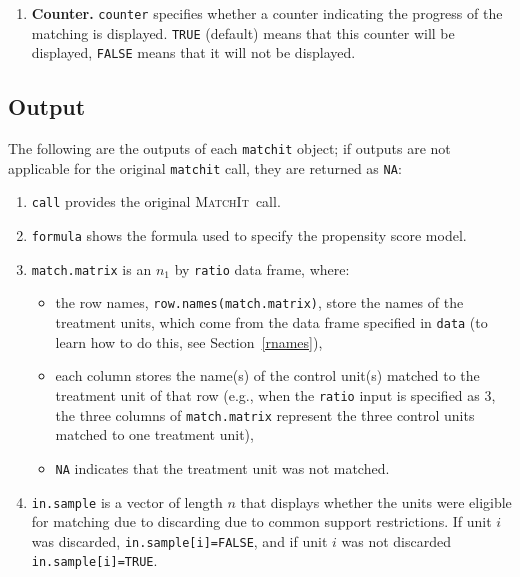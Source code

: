 \documentclass[oneside,letterpaper,titlepage]{article}
\newcommand{\MatchIt}{\textsc{MatchIt}}
\begin{document}
\begin{enumerate}
\item \textbf{Counter.} \texttt{counter} specifies whether a counter
  indicating the progress of the matching is displayed.  \texttt{TRUE}
  (default) means that this counter will be displayed, \texttt{FALSE}
  means that it will not be displayed.

\end{enumerate}
  
\subsection{Output}

The following are the outputs of each \texttt{matchit} object; if
outputs are not applicable for the original \texttt{matchit} call,
they are returned as \texttt{NA}:

\begin{enumerate}
  
\item \texttt{call} provides the original \MatchIt\ call.
 
\item \texttt{formula} shows the formula used to specify the
  propensity score model.
  
\item \texttt{match.matrix} is an $n_1$ by \texttt{ratio} data frame,
  where:

  \begin{itemize}
  \item the row names, \texttt{row.names(match.matrix)}, store the
    names of the treatment units, which come from the data frame
    specified in \texttt{data} (to learn how to do this, see
    Section~\ref{rnames}),
  \item each column stores the name(s) of the control unit(s) matched
    to the treatment unit of that row (e.g., when the \texttt{ratio}
    input is specified as 3, the three columns of
    \texttt{match.matrix} represent the three control units matched to
    one treatment unit),
   \item \texttt{NA} indicates that the treatment unit was not
     matched.  
   \end{itemize}
   
 \item \texttt{in.sample} is a vector of length $n$ that displays
   whether the units were eligible for matching due to discarding due
   to common support restrictions.  If unit $i$ was discarded,
   \texttt{in.sample[i]=FALSE}, and if unit $i$ was not discarded
   \texttt{in.sample[i]=TRUE}.
   

\end{enumerate}
\end{document}
